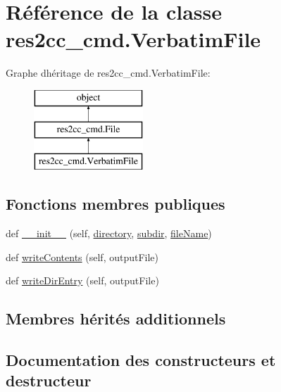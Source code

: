 \hypertarget{classres2cc__cmd_1_1_verbatim_file}{}\section{Référence de la classe res2cc\+\_\+cmd.\+Verbatim\+File}
\label{classres2cc__cmd_1_1_verbatim_file}
Graphe d\textquotesingle{}héritage de res2cc\+\_\+cmd.\+Verbatim\+File\+:\begin{figure}[H]
\begin{center}
\leavevmode
\includegraphics[height=3.000000cm]{classres2cc__cmd_1_1_verbatim_file}
\end{center}
\end{figure}
\subsection*{Fonctions membres publiques}
\begin{DoxyCompactItemize}
\item 
def \hyperlink{classres2cc__cmd_1_1_verbatim_file_a5df95b75aca6150a28690287f947183c}{\+\_\+\+\_\+init\+\_\+\+\_\+} (self, \hyperlink{classres2cc__cmd_1_1_file_ac4d2f8723afe8f54e99abc605b1f0cc6}{directory}, \hyperlink{classres2cc__cmd_1_1_file_ae6919ea0849ff51ff2679de78b50f44c}{subdir}, \hyperlink{classres2cc__cmd_1_1_file_ae2daaffd697b334701ec4a53d6c5e86d}{file\+Name})
\item 
def \hyperlink{classres2cc__cmd_1_1_verbatim_file_a0cc357aa532c69012b106f82adab23ca}{write\+Contents} (self, output\+File)
\item 
def \hyperlink{classres2cc__cmd_1_1_verbatim_file_a8c360e4f7d93c3b2b3967d98bb086bb8}{write\+Dir\+Entry} (self, output\+File)
\end{DoxyCompactItemize}
\subsection*{Membres hérités additionnels}


\subsection{Documentation des constructeurs et destructeur}
\hypertarget{classres2cc__cmd_1_1_verbatim_file_a5df95b75aca6150a28690287f947183c}{}
